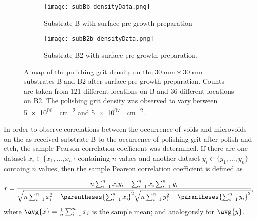 \begin{figure}[htbp]
    \centering
    \begin{subfigure}[t]{0.8\textwidth}
        \centering
        \texttt{[image: subBb\_densityData.png]}
        \caption{Substrate B with surface pre-growth preparation.}\label{fig:subBb_densityData}
    \end{subfigure}
    \par\bigskip
    \begin{subfigure}[t]{0.8\textwidth}
        \centering
        \texttt{[image: subB2b\_densityData.png]}
        \caption{Substrate B2 with surface pre-growth preparation.}\label{fig:subB2b_densityData}
    \end{subfigure}
    \caption[Map of the polishing grit density on substrate B and B2 after surface pre-growth preparation.]{A map of the polishing grit density on the $\SI{30}{\milli\metre}\times\SI{30}{\milli\metre}$ substrates B and B2 after surface pre-growth preparation. Counts are taken from 121 different locations on B and 36 different locations on B2. The polishing grit density was observed to vary between \SI{5e+06}{\particle\centi\metre^{-2}} and \SI{5e+07}{\particle\centi\metre^{-2}}.}
    \label{fig:subBb_and_subB2b_densityData}
\end{figure}

In order to observe correlations between the occurrence of voids and microvoids on the as-received substrate B to the occurrence of polishing grit after polish and etch, the sample Pearson correlation coefficient was determined.  If there are one dataset $x_i \in \{x_1, ..., x_n\}$ containing $n$ values and another dataset $y_i \in \{y_1, ..., y_n\}$ containg $n$ values, then the sample Pearson correlation coefficient is defined as

\begin{equation}\label{eq:pearson_correlation_coefficient}
    r = \frac{
        n\sum_{i=1}^nx_iy_i - \sum_{i=1}^n x_i \sum_{i=1}^n y_i
        }{
        \sqrt{n\sum_{i=1}^n x_i^2 - \parentheses{\sum_{i=1}^n x_i}^2}\sqrt{n\sum_{i=1}^n y_i^2 - \parentheses{\sum_{i=1}^n y_i}^2} },
\end{equation}
where $\avg{x}=\frac{1}{n}\sum_{i=1}^n x_i$ is the sample mean; and analogously for $\avg{y}$.
%


